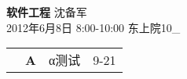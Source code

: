 \documentclass[twocolumn]{article}
\begin{document}
{\bf 软件工程} 沈备军 \\
2012年6月8日 8:00-10:00 东上院10\_ \\

\begin{tabular}{ | >{\bfseries}m{0.5em} | >{\bfseries}m{1em} | m{12em} | m{8em} |} \cline{1-4}
\multirow{50}{0.5em}{- \newline  \newline  \newline  \newline  \newline - \newline  \newline  \newline  \newline  \newline - \newline  \newline  \newline  \newline  \newline - \newline  \newline  \newline  \newline  \newline - \newline  \newline  \newline  \newline  \newline - \newline  \newline  \newline  \newline  \newline - \newline  \newline  \newline  \newline  \newline - \newline  \newline  \newline  \newline  \newline - \newline  \newline  \newline  \newline  \newline - \newline  \newline  \newline  \newline  \newline -} & Α & α测试 & 9-21\\ \cline{2-4}

\end{tabular}
\end{document}
